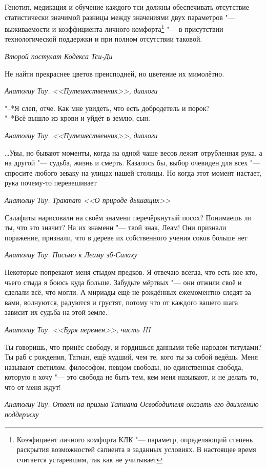 \documentclass[a4paper,10pt]{book}
\newcommand{\ldotst}{\so{...}\xspace}
\begin{document}
\epigraph{Генотип, медикация и обучение каждого тси должны обеспечивать 
отсутствие статистически значимой разницы между значениями двух параметров "--- 
выживаемости и коэффициента личного комфорта\footnote{Коээфициент личного 
комфорта КЛК "--- параметр, определяющий степень раскрытия возможностей 
сапиента в заданных условиях. В настоящее время считается устаревшим, так как 
не учитывает } "--- в присутствии технологической поддержки и при полном 
отсутствии таковой.}
{\textit{Второй постулат Кодекса Тси-Ди}}

\epigraph{Не найти прекраснее цветов преисподней, но цветение их мимолётно.}
{\textit{Анатолиу Тиу. <<Путешественник>>, диалоги}}

\epigraph{"--*Я слеп, отче. Как мне увидеть, что есть добродетель и порок?\\
"--*Всё вышло из крови и уйдёт в землю, сын.}
{\textit{Анатолиу Тиу. <<Путешественник>>, диалоги}}

\epigraph{\dots Увы, но бывают моменты, когда на одной чаше весов лежит 
отрубленная 
рука, а на другой "--- судьба, жизнь и смерть. Казалось бы, выбор очевиден для 
всех 
"--- спросите любого зеваку на улицах нашей столицы. Но когда этот момент 
настает, рука почему-то перевешивает\ldotst}
{\textit{Анатолиу Тиу. Трактат <<О природе дышащих>>}}

\epigraph{Салафиты нарисовали на своём знамени перечёркнутый посох? Понимаешь 
ли ты, что 
это значит? На их знамени "--- твой знак, Леам! Они признали поражение, 
признали, что в дереве их собственного учения соков больше нет\ldotst}
{\textit{Анатолиу Тиу. Письмо к Леаму эб-Салаху}}

\epigraph{Некоторые\ldotst попрекают меня стыдом предков. Я отвечаю всегда, что 
есть 
кое-кто, чьего стыда я боюсь куда больше. Забудьте мёртвых "--- они отжили своё 
и сделали всё, что могли. А мириады ещё не рождённых ежемоментно следят за вами,
волнуются, радуются и грустят, потому что от каждого вашего шага зависит 
их судьба на этой земле.}
{\textit{Анатолиу Тиу. <<Буря перемен>>, часть III}}

\epigraph{Ты говоришь, что принёс свободу, и гордишься данными тебе народом 
титулами? 
Ты раб с рождения, Татиан, ещё худший, чем те, кого ты за собой ведёшь. Меня 
называют светилом, философом, певцом свободы, но единственная свобода, которую 
я хочу "--- это свобода не быть тем, кем меня называют, и не делать то, что от 
меня ждут!}
{\textit{Анатолиу Тиу. Ответ на призыв Татиана Освободителя оказать его 
движению поддержку}}
\end{document}
